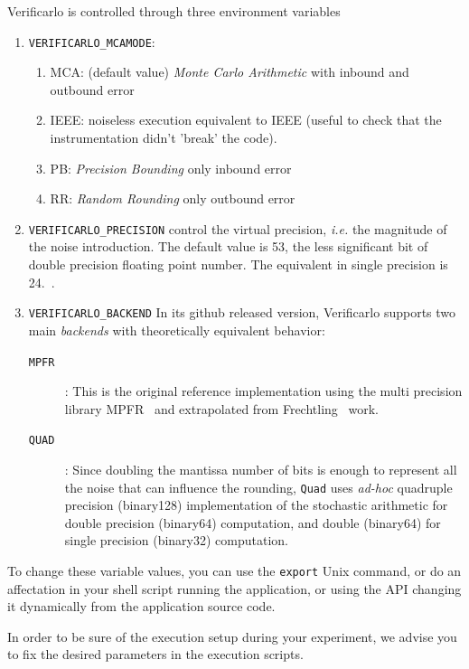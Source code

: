 \documentclass{TP}
\begin{document}
Verificarlo is controlled through three environment variables
\begin{enumerate}
\item {\tt  VERIFICARLO\_MCAMODE}:
\begin{enumerate}
\item MCA: (default value) {\it Monte Carlo Arithmetic} with inbound and outbound error
\item IEEE: noiseless execution equivalent to IEEE (useful to check that the instrumentation didn't 'break' the code).
\item PB: {\it Precision Bounding} only inbound error
\item RR: {\it Random Rounding} only outbound error
\end{enumerate}
\item {\tt VERIFICARLO\_PRECISION} control the virtual precision, {\it i.e.} the magnitude of the noise introduction. The default value is  53, the less significant bit of double precision floating point number. The equivalent in single precision is 24.~\cite{denis2016verificarlo,parker1997monte}.

\item {\tt VERIFICARLO\_BACKEND} In its github released version, Verificarlo supports two main {\it backends} with theoretically equivalent behavior:
\begin{description}
\item[{\tt MPFR}] : This is the original reference implementation using the multi precision library MPFR~\cite{Fousse:2007:MMB:1236463.1236468} and extrapolated from  Frechtling~\cite{frechtling2015automated} work.

\item[{\tt QUAD}] : Since doubling the mantissa number of bits is enough to represent all the noise that can influence the rounding, {\tt Quad} uses {\it ad-hoc} quadruple precision (binary128) implementation of the stochastic arithmetic for double precision (binary64) computation, and double (binary64) for single precision (binary32) computation.
\end{description}
\end{enumerate}

To change these variable values, you can use the  {\tt export} Unix command, or do an affectation in your shell script running the application, or using the API changing it dynamically from the application source code.

In order to be sure of the execution setup during your experiment, we advise you to fix the desired parameters in the execution scripts.
\end{document}
